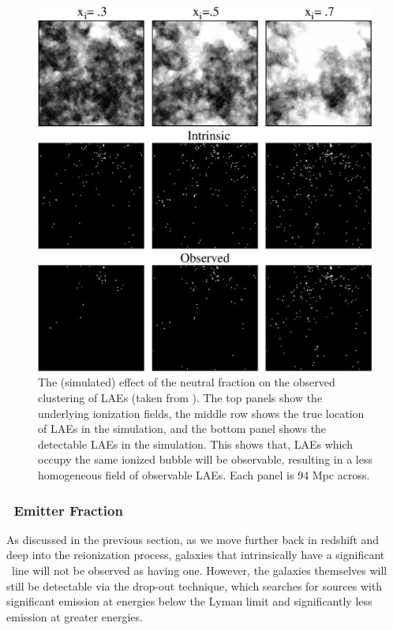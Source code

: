 \begin{figure}[h]
  \centering
  \includegraphics[width=13cm]{McQuinnLAEClusteringLarge.eps}
  \caption{The (simulated) effect of the neutral fraction on the observed clustering of LAEs (taken from \citealt{McQuinn:2007dy}). The top panels show the underlying ionization fields, the middle row shows the true location of LAEs in the simulation, and the bottom panel shows the detectable LAEs in the simulation. This shows that, LAEs which occupy the same ionized bubble will be observable, resulting in a less homogeneous field of observable LAEs. Each panel is 94 Mpc across. }
  \label{fig:McQuinnLAEClustering}
\end{figure}


\subsubsection{\lya\ Emitter Fraction}

As discussed in the previous section, as we move further back in redshift and deep into the reionization process, galaxies that intrinsically have a significant \lya\ line will not be observed as having one. However, the galaxies themselves will still be detectable via the drop-out technique, which searches for sources with significant emission at energies below the Lyman limit and significantly less emission at greater energies. 


